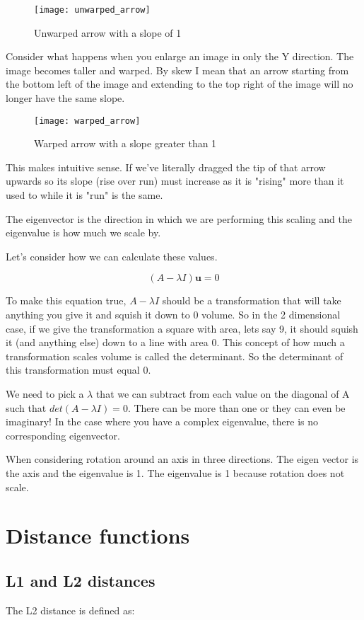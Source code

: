 \begin{figure}[h]
\caption{Unwarped arrow with a slope of 1}
\centering
\texttt{[image: unwarped\_arrow]}
\end{figure}

Consider what happens when you enlarge an image
in only the Y direction. The image becomes taller and warped. By skew I mean that an arrow starting from the 
bottom left of the image and extending to the top right of the image will no longer have the same slope. 

\begin{figure}[h]
\caption{Warped arrow with a slope greater than 1}
\centering
\texttt{[image: warped\_arrow]}
\end{figure}

This makes intuitive sense. If we've literally dragged the tip of that arrow upwards so its slope (rise over run)
must increase as it is "rising" more than it used to while it is "run" is the same. 

The eigenvector is the direction in which we are performing this scaling and the eigenvalue is how much
we scale by.

Let's consider how we can calculate these values.

\[\displaystyle (A-\lambda I)\mathbf {u} =0\]

To make this equation true, $A-\lambda I$ should be a transformation that will take anything you give
it and squish it down to 0 volume. So in the 2 dimensional case, if we give the transformation a square
with area, lets say 9,
it should squish it (and anything else) down to a line with area 0. This concept of how much a transformation
scales volume is called the determinant. So the determinant of this transformation must equal 0.

We need to pick a $\lambda$ that we can subtract from each value on the diagonal of A such that
$det(A-\lambda I)=0$. There can be more than one or they can even be imaginary! In the case where you have a 
complex eigenvalue, there is no corresponding eigenvector.

When considering rotation around an axis in three directions. The eigen vector is the axis and the eigenvalue
is 1. The eigenvalue is 1 because rotation does not scale.

\section{Distance functions}
\subsection{L1 and L2 distances}
The L2 distance is defined as:


